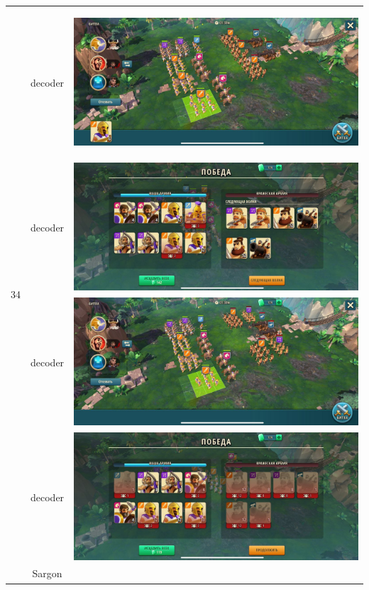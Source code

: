 \begin{longtable}{|c|c|c|}
    \hline
    \multirow{8}{*}{34} & decoder &
    \hypertarget{fight34}{\includegraphics[width=0.75\linewidth]{./parts/media/TreasureHunt/34/decoder/photo_2022-04-07_10-02-34.jpg}} \\
    & decoder &
    \includegraphics[width=0.75\linewidth]{./parts/media/TreasureHunt/34/decoder/photo_2022-04-07_10-02-43.jpg} \\
    & decoder &
    \includegraphics[width=0.75\linewidth]{./parts/media/TreasureHunt/34/decoder/photo_2022-04-07_10-02-46.jpg} \\
    & decoder &
    \includegraphics[width=0.75\linewidth]{./parts/media/TreasureHunt/34/decoder/photo_2022-04-07_10-02-50.jpg} \\
    \hline
    \multirow{8}{*}{34} & Sargon &

\end{longtable}
